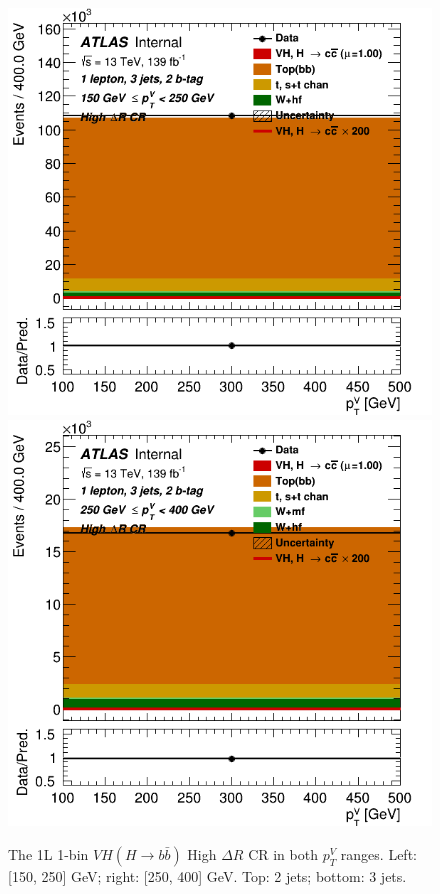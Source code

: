\begin{figure}[h!]
\includegraphics[scale=0.3]{Images/VH/SRsandTopCRs/Region_distpTV_DCRHigh_BMax250_L1_Y6051_TTypebb_T2_J3_BMin150_Prefit.png}
\includegraphics[scale=0.3]{Images/VH/SRsandTopCRs/Region_distpTV_DCRHigh_BMax400_L1_Y6051_TTypebb_T2_J3_BMin250_Prefit.png}
\caption{The 1L 1-bin  $VH(H\rightarrow b\bar{b})$ High $\Delta R$ CR in both $p_T^V$ ranges. Left: [150, 250] GeV; right: [250, 400] GeV. Top: 2 jets; bottom: 3 jets.} 
\label{fig:vhbbDRCR}
\end{figure}

